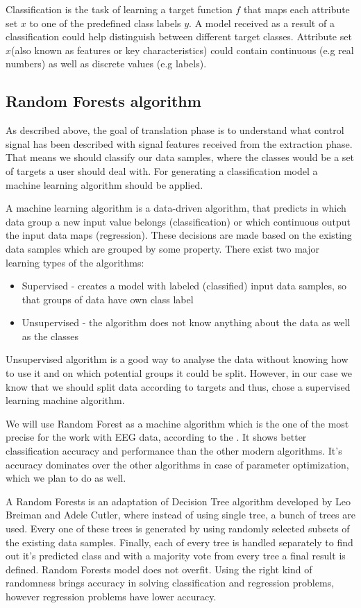 \documentclass[12pt]{article}
\begin{document}
Classification is the task of learning a target function $f$ that maps each attribute set $x$ to one of the predefined class labels $y$\cite{classification_basics}. A model received as a result of a classification could help distinguish between different target classes. Attribute set $x$(also known as features or key characteristics) could contain continuous (e.g real numbers) as well as discrete values (e.g labels).

\subsection{Random Forests algorithm}

As described above, the goal of translation phase is to understand what control signal has been described with signal features received from the extraction phase. That means we should classify our data samples, where the classes would be a set of targets a user should deal with. For generating a classification model a machine learning algorithm should be applied. 

A machine learning algorithm is a data-driven algorithm, that predicts in which data group a new input value belongs (classification) or which continuous output the input data maps (regression). These decisions are made based on the existing data samples which are grouped by some property. There exist two major learning types of the algorithms\cite{ml_types}:
\begin{itemize}
\item Supervised - creates a model with labeled (classified) input data samples, so that groups of data have own class label
\item Unsupervised - the algorithm does not know anything about the data as well as the classes
\end{itemize}
Unsupervised algorithm is a good way to analyse the data without knowing how to use it and on which potential groups it could be split. However, in our case we know that we should split data according to targets and thus, chose a supervised learning machine algorithm.

We will use Random Forest as a machine algorithm which is the one of the most precise for the work with EEG data, according to the \cite{masso}. It shows better classification accuracy and performance than the other modern algorithms. It's accuracy dominates over the other algorithms in case of parameter optimization, which we plan to do as well. 

A Random Forests is an adaptation of Decision Tree algorithm developed by Leo Breiman and Adele Cutler, where instead of using single tree, a bunch of trees are used. Every one of these trees is generated by using randomly selected subsets of the existing data samples. Finally, each of every tree is handled separately to find out it's predicted class and with a majority vote from every tree a final result is defined. Random Forests model does not overfit. Using the right kind of randomness brings accuracy in solving classification and regression problems, however regression problems have lower accuracy.\cite{breiman_rf}
\end{document}
